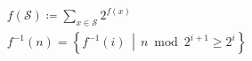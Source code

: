 \documentclass{article}
\begin{document}
\begin{align*}
& f(\mathcal S) \coloneqq
\sum_{x \in \mathcal S}
2^{f(x)} \\
& f^{-1}(n) =
\left\{
f^{-1}(i)
\,\middle|\,
n \bmod2^{i+1} \geqslant 2^i
\right\}
\end{align*}
\end{document}
